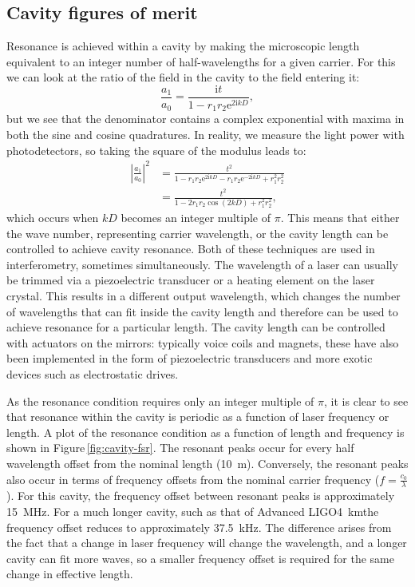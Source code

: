 \subsection{\label{sec:cavity-fom}Cavity figures of merit}
Resonance is achieved within a \FP{} cavity by making the microscopic length equivalent to an integer number of half-wavelengths for a given carrier. For this we can look at the ratio of the field in the cavity to the field entering it:
\begin{equation}
  \frac{a_1}{a_0} = \frac{\text{i} t}{1 - r_1 r_2 \text{e}^{2\text{i}kD}},
\end{equation}
but we see that the denominator contains a complex exponential with maxima in both the sine and cosine quadratures. In reality, we measure the light power with photodetectors, so taking the square of the modulus leads to:
\begin{equation}
  \begin{split}
    \left|\frac{a_1}{a_0}\right|^2 &= \frac{t^2}{1-r_1 r_2 \text{e}^{2\text{i}kD} - r_1 r_2 \text{e}^{-2\text{i}kD} + r_1^2 r_2^2} \\
                                   &= \frac{t^2}{1 - 2 r_1 r_2 \cos{\left( 2kD \right)} + r_1^2 r_2^2},
  \end{split}
\end{equation}
which occurs when $kD$ becomes an integer multiple of $\pi$. This means that either the wave number, representing carrier wavelength, or the cavity length can be controlled to achieve cavity resonance. Both of these techniques are used in interferometry, sometimes simultaneously. The wavelength of a laser can usually be trimmed via a piezoelectric transducer or a heating element on the laser crystal. This results in a different output wavelength, which changes the number of wavelengths that can fit inside the cavity length and therefore can be used to achieve resonance for a particular length. The cavity length can be controlled with actuators on the mirrors: typically voice coils and magnets, these have also been implemented in the form of piezoelectric transducers and more exotic devices such as electrostatic drives.

As the resonance condition requires only an integer multiple of $\pi$, it is clear to see that resonance within the cavity is periodic as a function of laser frequency or length. A plot of the resonance condition as a function of length and frequency is shown in Figure\,\ref{fig:cavity-fsr}. The resonant peaks occur for every half wavelength offset from the nominal length (\SI{10}{\meter}). Conversely, the resonant peaks also occur in terms of frequency offsets from the nominal carrier frequency ($f = \frac{c_0}{\lambda}$). For this cavity, the frequency offset between resonant peaks is approximately \SI{15}{\mega\hertz}. For a much longer cavity, such as that of Advanced LIGO\textemdash \SI{4}{\kilo\meter}\textemdash the frequency offset reduces to approximately \SI{37.5}{\kilo\hertz}. The difference arises from the fact that a change in laser frequency will change the wavelength, and a longer cavity can fit more waves, so a smaller frequency offset is required for the same change in effective length.

